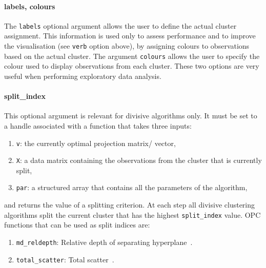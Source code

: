 \documentclass{book}
\begin{document}
\paragraph{labels, colours}
%
The {\tt labels} optional argument allows the user to define the actual cluster
assignment. This information is used only to assess performance and to improve
the visualisation (see {\tt verb} option above), by assigning colours to
observations based on the actual cluster. The argument {\tt colours} allows the
user to specify the colour used to display observations from each cluster.
These two options are very useful when performing exploratory data analysis.

\paragraph{split\_index}
%
This optional argument is relevant for divisive algorithms only.
It must be set to a handle associated with a function that 
takes three inputs:
%
\begin{enumerate}

\item {\tt v}: the currently optimal projection matrix/ vector,

\item {\tt X}: a data matrix containing the observations from the cluster that is currently split,

\item {\tt par}: a structured array that contains all the parameters of the algorithm,

\end{enumerate}
%
and returns the value of a splitting criterion. At each step
all divisive clustering algorithms split the current cluster that has the highest
{\tt split\_index} value.
%
OPC functions that can be used as split indices are:
%
\begin{enumerate}

\item {\tt md\_reldepth}: Relative depth of separating hyperplane~\cite{PavlidisHT2016}.

\item {\tt total\_scatter}: Total scatter~\cite{Boley1998}.

\end{enumerate}
\end{document}
